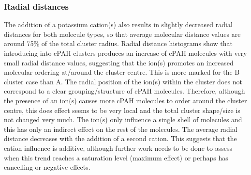 \subsubsection{Radial distances} %
The addition of a potassium cation(s) also results in slightly %
decreased radial distances for both molecule types, so that average molecular distance values are around 75\% of the total cluster radius. Radial distance histograms show that introducing  into cPAH clusters produces an increase of cPAH molecules with very small radial distance values, suggesting that the ion(s) promotes an increased molecular ordering at/around the cluster centre. This is more marked for the B cluster case than A. 
The radial position of the ion(s) within the cluster does not correspond to a clear grouping/structure of cPAH molecules. %
Therefore, although the presence of an ion(s) causes more cPAH molecules to order around the cluster centre, this does effect seems to be very local and the total cluster shape/size is not changed very much. The ion(s) only influence a single shell of molecules and this has only an indirect effect on the rest of the molecules. %
The average radial distance decreases with the addition of a second cation. %
This suggests that the cation influence is additive, although further work needs to be done to assess when this trend reaches a saturation level (maximum effect) or perhaps has cancelling or negative effects. 

